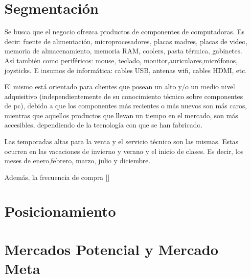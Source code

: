 \documentclass[11pt,a4paper]{article}
\begin{document}
\section{Segmentación} 

Se busca que el negocio ofrezca productos de componentes de computadoras. Es decir: fuente de alimentación, microprocesadores, placas madres, placas de video, memoria de almacenamiento, memoria RAM, coolers, pasta térmica, gabinetes. Así también como periféricos: mouse, teclado, monitor,auriculares,micrófonos, joysticks. E insumos de informática: cables USB, antenas wifi, cables HDMI, etc.

El mismo está orientado para clientes que posean un alto y/o un medio nivel adquisitivo (independientemente de su conocimiento técnico sobre componentes de pc), debido a que los componentes más recientes o más nuevos son más caros, mientras que aquellos productos que llevan un tiempo en el mercado, son más accesibles, dependiendo de la tecnología con que se han fabricado.


Las temporadas altas para la venta y el servicio técnico son las mismas. Estas ocurren en las vacaciones de invierno y verano y el inicio de clases. Es decir, los meses de  enero,febrero, marzo, julio y diciembre.

Además, la frecuencia de compra []


\section{Posicionamiento}

\section{Mercados Potencial y Mercado Meta}

\end{document}
